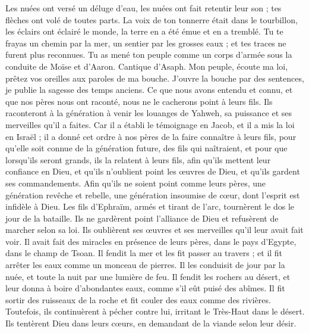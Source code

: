 \begin{multicols}{2}
Les nuées ont versé un déluge d'eau, les nuées ont fait retentir leur son ; tes flèches ont volé de toutes parts.
La voix de ton tonnerre était dans le tourbillon, les éclairs ont éclairé le monde, la terre en a été émue et en a tremblé.
Tu te frayas un chemin par la mer, un sentier par les grosses eaux ; et tes traces ne furent plus reconnues.
Tu as mené ton peuple comme un corps d’armée sous la conduite de Moïse et d'Aaron.
\VerseOne{}Cantique d'Asaph. Mon peuple, écoute ma loi, prêtez vos oreilles aux paroles de ma bouche.
J'ouvre la bouche par des sentences, je publie la sagesse des temps anciens.
Ce que nous avons entendu et connu, et que nos pères nous ont raconté,
nous ne le cacherons point à leurs fils. Ils raconteront à la génération à venir les louanges de Yahweh, sa puissance et ses merveilles qu'il a faites.
Car il a établi le témoignage en Jacob, et il a mis la loi en Israël ; il a donné cet ordre à nos pères de la faire connaître à leurs fils,
pour qu’elle soit connue de la génération future, des fils qui naîtraient, et pour que lorsqu’ils seront grands, ils la relatent à leurs fils,
afin qu'ils mettent leur confiance en Dieu, et qu'ils n'oublient point les œuvres de Dieu, et qu'ils gardent ses commandements.
Afin qu'ils ne soient point comme leurs pères, une génération revêche et rebelle, une génération insoumise de cœur, dont l’esprit est infidèle à Dieu.
Les fils d'Ephraïm, armés et tirant de l’arc, tournèrent le dos le jour de la bataille.
Ils ne gardèrent point l'alliance de Dieu et refusèrent de marcher selon sa loi.
Ils oublièrent ses œuvres et ses merveilles qu'il leur avait fait voir.
Il avait fait des miracles en présence de leurs pères, dans le pays d'Egypte, dans le champ de Tsoan.
Il fendit la mer et les fit passer au travers ; et il fit arrêter les eaux comme un monceau de pierres.
Il les conduisit de jour par la nuée, et toute la nuit par une lumière de feu.
Il fendit les rochers au désert, et leur donna à boire d’abondantes eaux, comme s'il eût puisé des abîmes.
Il fit sortir des ruisseaux de la roche et fit couler des eaux comme des rivières.
Toutefois, ils continuèrent à pécher contre lui, irritant le Très-Haut dans le désert.
Ils tentèrent Dieu dans leurs cœurs, en demandant de la viande selon leur désir.

\end{multicols}
